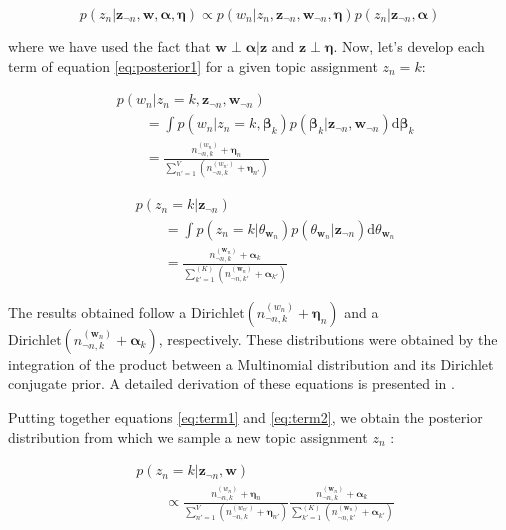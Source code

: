 \documentclass{article}
\newcommand{\diff}{\mathrm{d}}
\begin{document}
\begin{equation}\label{eq:posterior1}
p(z_n|\mathbf{z}_{\neg n}, \mathbf{w}, \bm{\alpha}, \bm{\eta}) \propto p(w_n|z_n,\mathbf{z}_{\neg n}, \mathbf{w}_{\neg n}, \bm{\eta}) p(z_n|\mathbf{z}_{\neg n}, \bm{\alpha})
\end{equation}

where we have used the fact that $\mathbf{w}\!\!\perp\!\!\bm{\alpha}|\mathbf{z}$ and $\mathbf{z}\!\!\perp\!\!\bm{\eta}$. Now, let's develop each term of equation \ref{eq:posterior1} for a given topic assignment $z_n = k$:

\begin{align}\label{eq:term1}
&p(w_n|z_n=k, \mathbf{z}_{\neg n}, \mathbf{w}_{\neg n}) \nonumber\\
& \qquad = \int p(w_n|z_n=k, \bm{\beta}_k)p(\bm{\beta}_k|\mathbf{z}_{\neg n}, \mathbf{w}_{\neg n}) \diff \bm{\beta}_k \nonumber\\
& \qquad = \frac{n_{\neg n,k}^{(w_n)} + \bm{\eta}_n}{\sum_{n'=1}^{V}\left( n_{\neg n, k} ^{(w_{n'})} + \bm{\eta}_{n'}\right)}
\end{align}

\begin{align}\label{eq:term2}
&p(z_n=k|\mathbf{z}_{\neg n}) \nonumber\\
& \qquad = \int p(z_n=k|\theta_{\mathbf{w}_n}) p(\theta_{\mathbf{w}_n}|\mathbf{z}_{\neg n}) \diff \theta_{\mathbf{w}_n} \nonumber\\
& \qquad = \frac{n_{\neg n, k} ^{(\mathbf{w}_n)} + \bm{\alpha}_k}{\sum_{k'=1}^{(K)} \left( n_{\neg n, k'} ^{(\mathbf{w}_n)} + \bm{\alpha}_{k'} \right) }
\end{align}

The results obtained follow a $\mathrm{Dirichlet}\left(n_{\neg n,k}^{(w_n)} + \bm{\eta}_n\right)$ and a $\mathrm{Dirichlet}\left(n_{\neg n, k} ^{(\mathbf{w}_n)} + \bm{\alpha}_k\right)$, respectively. These distributions were obtained by the integration of the product between a Multinomial distribution and its Dirichlet conjugate prior. A detailed derivation of these equations is presented in \cite{heinrich2005parameter}.

Putting together equations \ref{eq:term1} and \ref{eq:term2}, we obtain the posterior distribution from which we sample a new topic assignment $z_n$ :

\begin{align}\label{eq:posterior_sampling}
& p(z_n=k|\mathbf{z}_{\neg n}, \mathbf{w}) \nonumber\\
& \qquad \propto \frac{n_{\neg n,k}^{(w_n)} + \bm{\eta}_n}{\sum_{n'=1}^{V}\left( n_{\neg n, k} ^{(w_{n'})} + \bm{\eta}_{n'}\right)}\frac{n_{\neg n, k} ^{(\mathbf{w}_n)} + \bm{\alpha}_k}{\sum_{k'=1}^{(K)} \left( n_{\neg n, k'} ^{(\mathbf{w}_n)} + \bm{\alpha}_{k'} \right) }
\end{align}
\end{document}
